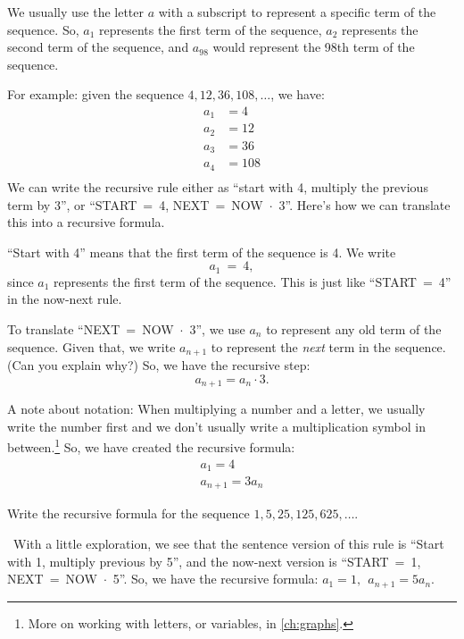 We usually use the letter $a$ with a subscript to represent a specific term of the sequence. So, $a_1$ represents the first term of the sequence, $a_2$ represents the second term of the sequence, and $a_{98}$ would represent the 98th term of the sequence.

For example: given the sequence $4, 12, 36, 108, \dotsc$, we have:
\[\begin{aligned}
a_1 &= 4\\
a_2 &= 12\\
a_3 &= 36\\
a_4 &= 108\\
\end{aligned}\]
We can write the recursive rule either as ``start with 4, multiply the previous term by 3'', or ``START~=~4, NEXT~=~NOW~$\cdot$~3''. Here's how we can translate this into a recursive formula.

``Start with 4'' means that the first term of the sequence is 4. We write \[a_1~=~4,\] since $a_1$ represents the first term of the sequence. This is just like ``START~=~4'' in the now-next rule.

To translate ``NEXT~=~NOW~$\cdot$~3'', we use $a_n$ to represent any old term of the sequence. Given that, we write $a_{n+1}$ to represent the \textit{next} term in the sequence. (Can you explain why?) So, we have the recursive step: \[a_{n+1}=a_n\cdot3.\]

A note about notation: When multiplying a number and a letter, we usually write the number first and we don't usually write a multiplication symbol in between.\footnote{More on working with letters, or variables, in \cref{ch:graphs}.} So, we have created the recursive formula: \[\begin{array}{c}a_1=4 \\ a_{n+1}=3a_n\end{array}\]

\begin{boxex}
Write the recursive formula for the sequence $1, 5, 25, 125, 625, \dotsc$.

\exsoln\ With a little exploration, we see that the sentence version of this rule is ``Start with 1, multiply previous by 5'', and the now-next version is ``START~=~1, NEXT~=~NOW~$\cdot$~5''. So, we have the recursive formula: $a_1 = 1, ~~ a_{n+1}=5a_n$.
\end{boxex}
 
